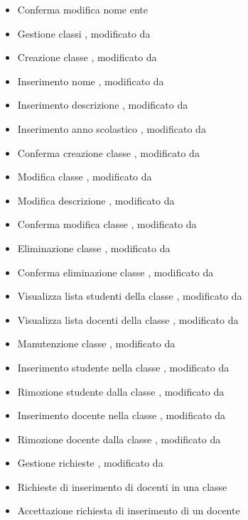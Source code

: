 \begin{itemize}
	\item {} Conferma modifica nome ente
	\item {} Gestione classi , modificato da 
	\item {} Creazione classe , modificato da 
	\item {} Inserimento nome , modificato da 
	\item {} Inserimento descrizione , modificato da 
	\item {} Inserimento anno scolastico , modificato da 
	\item {} Conferma creazione classe , modificato da 
	\item {} Modifica classe , modificato da 
	\item {} Modifica descrizione , modificato da 
	\item {} Conferma modifica classe , modificato da 
	\item {} Eliminazione classe , modificato da 
	\item {} Conferma eliminazione classe , modificato da 
	\item {} Visualizza lista studenti della classe , modificato da 
	\item {} Visualizza lista docenti della classe , modificato da 
	\item {} Manutenzione classe , modificato da 
	\item {} Inserimento studente nella classe , modificato da 
	\item {} Rimozione studente dalla classe , modificato da 
	\item {} Inserimento docente nella classe , modificato da 
	\item {} Rimozione docente dalla classe , modificato da 
	\item {} Gestione richieste , modificato da 
	\item {} Richieste di inserimento di docenti in una classe
	\item {} Accettazione richiesta di inserimento di un docente

\end{itemize}
